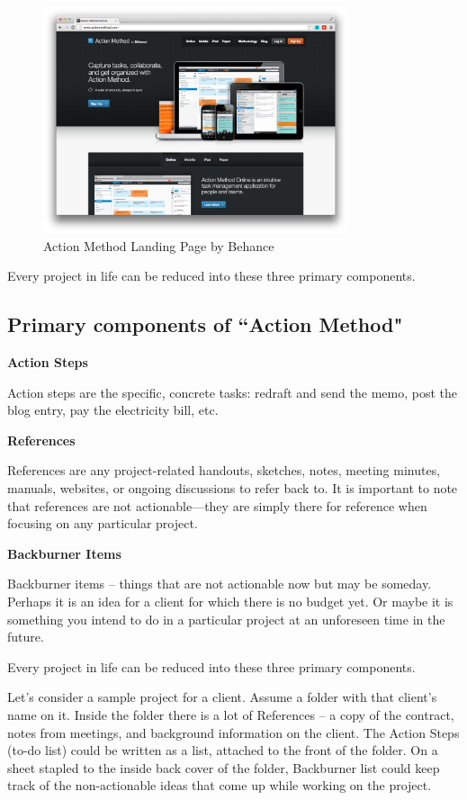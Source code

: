 \begin{figure}
	\centering
	\includegraphics[width=0.8\textwidth]{resources/actionmethod.png}
	\caption[Action Method by Behance]{Action Method Landing Page by Behance}
\end{figure}

Every project in life can be reduced into these three primary components.

\subsection{Primary components of ``Action Method"}

\textbf{Action Steps}

Action steps are the specific, concrete tasks: redraft and send the memo, post the blog entry, pay the electricity bill, etc.

\textbf{References}

References are any project-related handouts, sketches, notes, meeting minutes, manuals, websites, or ongoing discussions to refer back to. It is important to note that references are not actionable—they are simply there for reference when focusing on any particular project.

\textbf{Backburner Items}

Backburner items -- things that are not actionable now but may be someday. Perhaps it is an idea for a client for which there is no budget yet. Or maybe it is something you intend to do in a particular project at an unforeseen time in the future.

Every project in life can be reduced into these three primary components.

Let’s consider a sample project for a client. Assume a folder with that client’s name on it. Inside the folder there is a lot of References -- a copy of the contract, notes from meetings, and background information on the client. The Action Steps (to-do list) could be written as a list, attached to the front of the folder. On a sheet stapled to the inside back cover of the folder, Backburner list could keep track of the non-actionable ideas that come up while working on the project.

